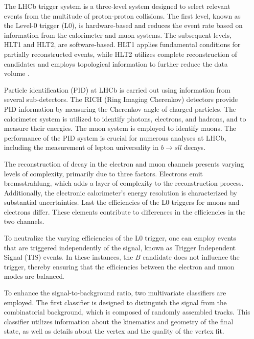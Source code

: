 The LHCb trigger system is a three-level system designed to select relevant events from 
the multitude of proton-proton collisions. The first level, known as the Level-0 trigger 
(L0), is hardware-based and reduces the event rate based on information from the calorimeter 
and muon systems. The subsequent levels, HLT1 and HLT2, are software-based. HLT1 applies 
fundamental conditions for partially reconstructed events, while HLT2 utilizes complete 
reconstruction of candidates and employs topological information to further reduce the 
data volume \cite{trigger}.

Particle identification (PID) at LHCb is carried out using information from several 
sub-detectors. The RICH (Ring Imaging Cherenkov) detectors provide PID information by 
measuring the Cherenkov angle of charged particles. The calorimeter system is utilized 
to identify photons, electrons, and hadrons, and to measure their energies. The muon 
system is employed to identify muons. The performance of the PID system is crucial for 
numerous analyses at LHCb, including the measurement of lepton universality in $b\to sll$ 
decays.

The reconstruction of decay in the electron and muon channels presents varying levels of complexity, 
primarily due to three factors. Electrons emit bremsstrahlung, which adds a layer of complexity to the 
reconstruction process. Additionally, the electronic calorimeter's energy resolution is characterized 
by substantial uncertainties. Last the efficiencies of the L0 triggers for muons and electrons 
differ. These elements contribute to differences in the efficiencies in 
the two channels. 

To neutralize the varying efficiencies of the L0 trigger, one can employ events that are 
triggered independently of the signal, known as Trigger Independent Signal (TIS) events. 
In these instances, the $B$ candidate does not influence the trigger, thereby ensuring that 
the efficiencies between the electron and muon modes are balanced.


To enhance the signal-to-background ratio, two multivariate classifiers are employed. The 
first classifier is designed to distinguish the signal from the combinatorial background, 
which is composed of randomly assembled tracks. This classifier utilizes information about 
the kinematics and geometry of the final state, as well as details about the vertex and the 
quality of the vertex fit.

